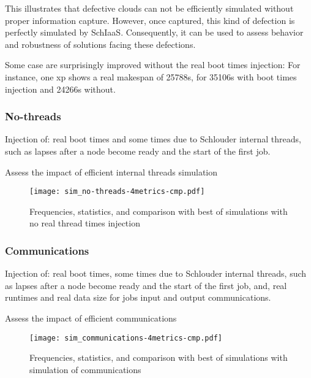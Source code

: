 This illustrates that defective clouds can not be efficiently simulated without 
proper information capture. However, once captured, this kind of defection is
perfectly simulated by SchIaaS. Consequently, it can be used to assess behavior 
and robustness of solutions facing these defections.

Some case are surprisingly improved without the real boot times injection:
For instance, one xp shows a real makespan of 25788s, for 35106s with boot times
injection and 24266s without. 




\subsubsection{No-threads}

Injection of: real boot times and some times due to Schlouder internal threads, 
such as lapses after a node become ready and the start of the first job.

Assess the impact of efficient internal threads simulation

\begin{figure}
  \centering
  \texttt{[image: sim\_no-threads-4metrics-cmp.pdf]}
  
  

  

  
    
  \caption{Frequencies, statistics, and comparison with best of simulations with no real thread times
  injection}
\end{figure} 



\subsubsection{Communications}

Injection of: real boot times, some times due to Schlouder internal threads, 
such as lapses after a node become ready and the start of the first job, 
and, real runtimes and real data size for jobs input and output communications.

Assess the impact of efficient communications 

\begin{figure}
  \centering
  \texttt{[image: sim\_communications-4metrics-cmp.pdf]}
  
  

  

  

  \caption{Frequencies, statistics, and comparison with best of simulations with simulation of communications}
\end{figure} 

